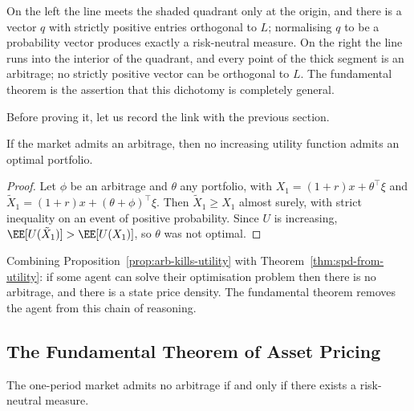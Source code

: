 On the left the line meets the shaded quadrant only at the origin, and there is a vector $q$ with strictly positive entries orthogonal to $L$; normalising $q$ to be a probability vector produces exactly a risk-neutral measure. On the right the line runs into the interior of the quadrant, and every point of the thick segment is an arbitrage; no strictly positive vector can be orthogonal to $L$. The fundamental theorem is the assertion that this dichotomy is completely general.

Before proving it, let us record the link with the previous section.

\begin{proposition}\label{prop:arb-kills-utility}
	If the market admits an arbitrage, then no increasing utility function admits an optimal portfolio.
\end{proposition}

\begin{proof}
	Let $\phi$ be an arbitrage and $\theta$ any portfolio, with $X_1 = (1+r)x + \theta^\top\xi$ and $\tilde X_1 = (1+r)x + (\theta+\phi)^\top \xi$. Then $\tilde X_1 \geq X_1$ almost surely, with strict inequality on an event of positive probability. Since $U$ is increasing, $\EE[U(\tilde X_1)] > \EE[U(X_1)]$, so $\theta$ was not optimal.
\end{proof}

Combining Proposition~\ref{prop:arb-kills-utility} with Theorem~\ref{thm:spd-from-utility}: if some agent can solve their optimisation problem then there is no arbitrage, and there is a state price density. The fundamental theorem removes the agent from this chain of reasoning.

\subsection{The Fundamental Theorem of Asset Pricing}

\begin{theorem}\label{thm:ftap1}
	The one-period market admits no arbitrage if and only if there exists a risk-neutral measure.
\end{theorem}

